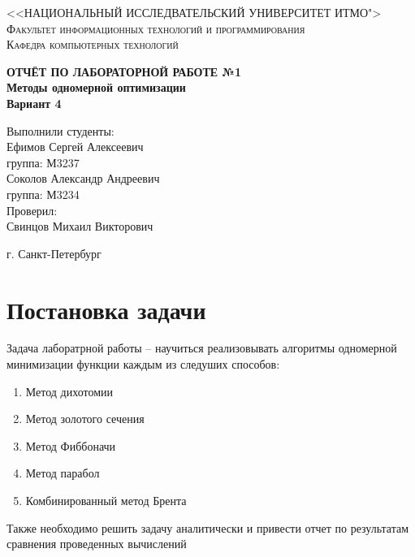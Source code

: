 \documentclass[a4paper, 14pt]{article}
\begin{document}
	\renewcommand{\chaptername}{Лабораторная работа}
	\def\contentsname{Содержание}

	\begin{titlepage}
		\begin{center}
			\textsc{<<НАЦИОНАЛЬНЫЙ ИССЛЕДВАТЕЛЬСКИЙ УНИВЕРСИТЕТ ИТМО">\\[5mm]
			Факультет информационных технологий и программирования\\[2mm]
			Кафедра компьютерных технологий}

			\vfill

			\textbf{ОТЧЁТ ПО ЛАБОРАТОРНОЙ РАБОТЕ №1\\[3mm]
			Методы одномерной оптимизации\\[6mm]
			Вариант 4
			\\[20mm]
			}
		\end{center}

		\hfill
		\begin{minipage}{.5\textwidth}
			Выполнили студенты:\\[2mm]
			Ефимов Сергей Алексеевич\\
			группа: М3237\\[2mm]
			Соколов Александр Андреевич\\
			группа: М3234\\[5mm]

			Проверил:\\[2mm]
			Свинцов Михаил Викторович
		\end{minipage}%
		\vfill
		\begin{center}
			г. Санкт-Петербург
		\end{center}
	\end{titlepage}


	\section*{Постановка задачи}
	Задача лаборатрной работы  -- научиться реализовывать алгоритмы одномерной минимизации функции каждым из следуших способов:
	\begin{enumerate}
		\item Метод дихотомии
		\item Метод золотого сечения
		\item Метод Фиббоначи
		\item Метод парабол
		\item Комбинированный метод Брента
	\end{enumerate}
	Также необходимо решить задачу аналитически и привести отчет по результатам сравнения проведенных вычислений
\end{document}
